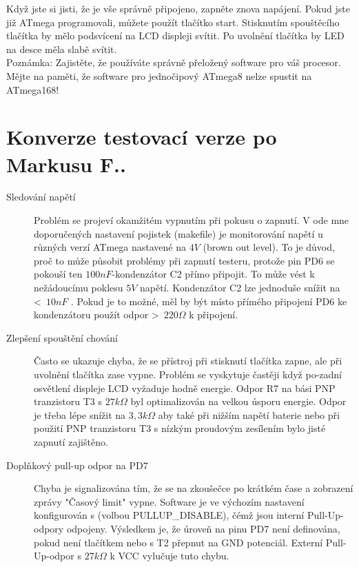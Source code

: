 Když jste si jisti, že je vše správně připojeno, zapněte znova napájení.
Pokud jste již ATmega programovali, můžete použít tlačítko start.
Stisknutím spouštěcího tlačítka by mělo podsvícení na LCD displeji svítit.
Po uvolnění tlačítka by LED na desce měla slabě svítit.\\
Poznámka: Zajistěte, že používáte správně přeložený software pro váš procesor.
Mějte na paměti, že software pro jednočipový ATmega8 nelze spustit na ATmega168!
\vspace{-0.3cm}
\section{Konverze testovací verze po Markusu F..}
\label{sec:change_markus}
\vspace{-0.3cm}
\begin{description}
\item[Sledování napětí]  
Problém se projeví okamžitém vypnutím při pokusu o zapnutí.
V ode mne doporučených nastavení pojistek (makefile) je monitorování napětí u
různých verzí ATmega nastavené na \(4V\)  (brown out level).  To je důvod, proč to může působit
problémy při zapnutí testeru, protože pin PD6 se pokouší ten \(100nF\)-kondenzátor C2 
přímo připojit. To může vést k nežádoucímu poklesu \(5V\)  napětí.
Kondenzátor C2 lze jednoduše snížit na \textless~\(10nF\) . Pokud je to možné, měl by být
místo přímého připojení PD6 ke kondenzátoru použít odpor \textgreater~\(220\Omega\) k připojení.
\vspace{-0.3cm}
\item[Zlepšení spouštění chování]
Často se ukazuje chyba, že se přístroj při stisknutí tlačítka zapne, ale při uvolnění tlačítka
zase vypne. Problém se vyskytuje častěji když po-zadní osvětlení displeje LCD vyžaduje hodně energie.
Odpor R7 na bási PNP tranzistoru T3 s \(27k\Omega\)  byl optimalizován na velkou úsporu energie.
Odpor je třeba lépe snížit na \(3,3k\Omega\) aby také při nižším napětí baterie nebo při použití
PNP tranzistoru T3 s nízkým proudovým zesílením bylo jisté zapnutí zajištěno.
\vspace{-0.3cm}
\item[Doplňkový pull-up odpor na PD7]
Chyba je signalizována tím, že se na zkoušečce po krátkém čase a zobrazení zprávy
"Časový limit" vypne. Software je ve výchozím nastavení konfigurován s (volbou PULLUP\_DISABLE),
čémž jsou interní Pull-Up-odpory odpojeny.
Výsledkem je, že úroveň na pinu PD7 není definována, pokud není tlačítkem nebo s T2 přepnut na GND potenciál.
Externí  Pull-Up-odpor s \(27k\Omega\) k VCC vylučuje tuto chybu.

\end{description}
